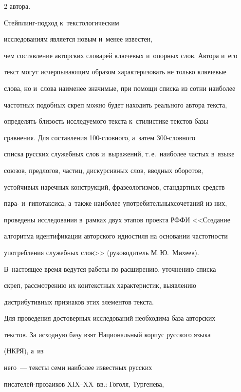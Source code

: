 \begin{multicols}{2}
автора. 





Стейплинг-под\-ход к~текстологическим 


исследованиям является новым и~менее из\-вес\-тен, 


чем составление авторских словарей ключевых и~опорных слов. Автора и~его 


текст могут исчерпывающим образом характеризовать не только ключевые 


слова, но и~слова наименее значимые, при помощи списка из сотни наиболее 


частотных подобных скреп можно будет находить реального автора текста, 


определять близость исследуемого текста к~стилистике текстов базы 


сравнения. Для составления 100-слов\-но\-го, а~затем 300-слов\-но\-го 


списка русских служебных слов и~выражений, т.\,е.\ наиболее частых в~языке 


союзов, предлогов, час\-тиц, дискурсивных слов, вводных оборотов, 


устойчивых наречных конструкций, фразеологизмов, стандартных средств 


пара- и~гипотаксиса, а~также наиболее употребительных\linebreak сочетаний из них, 


проведены исследования в~рамках двух этапов проекта РФФИ <<Создание 


алгоритма идентификации авторского идиостиля на основании час\-тот\-ности 


употребления служебных слов>> (руководитель М.\,Ю.~Михеев). 


В~настоящее время ведутся работы по расширению, уточнению списка 


скреп, рас\-смот\-ре\-нию их контекстных характеристик, выявлению 


дистрибутивных признаков этих элементов текста.


     


     Для проведения достоверных исследований необходима база авторских 


текстов. За исходную базу взят Национальный корпус русского языка


(НКРЯ), а~из 


него~--- тексты семи наиболее известных русских  


пи\-са\-те\-лей-про\-заи\-ков XIX--XX~вв.: Гоголя, Тургенева, 



\end{multicols}
